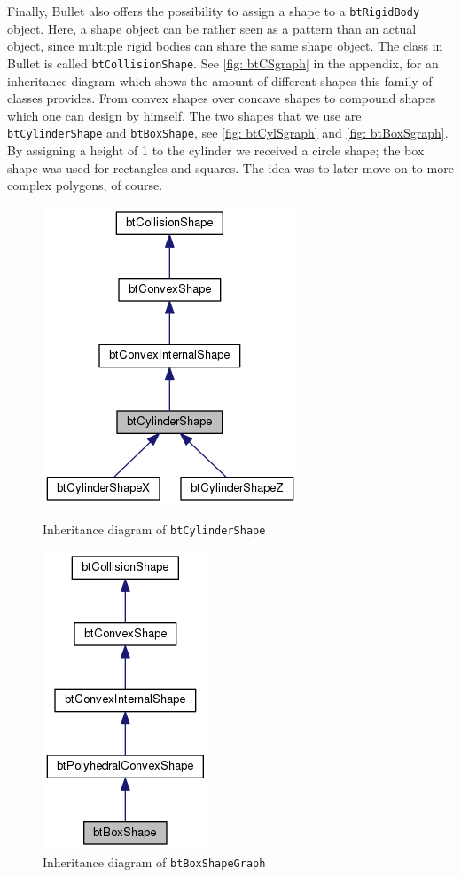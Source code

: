 Finally, Bullet also offers the possibility to assign a shape to a \texttt{btRigidBody} object. Here, a shape object can be rather seen as a pattern than an actual object, since multiple rigid bodies can share the same shape object. The class in Bullet is called \texttt{btCollisionShape}. See \autoref{fig: btCSgraph} in the appendix, for an inheritance diagram which shows the amount of different shapes this family of classes provides. From convex shapes over concave shapes to compound shapes which one can design by himself. The two shapes that we use are \texttt{btCylinderShape} and \texttt{btBoxShape}, see \autoref{fig: btCylSgraph} and \autoref{fig: btBoxSgraph}. By assigning a height of 1 to the cylinder we received a circle shape; the box shape was used for rectangles and squares. The idea was to later move on to more complex polygons, of course.
\begin{figure}[ht]
\centering
\begin{minipage}{.45\linewidth}
\centering
\includegraphics[scale=0.5]{img/RigidBodies/btCylinderShapeGraph.png}
\caption{Inheritance diagram of \texttt{btCylinderShape}}
\label{fig: btCylSgraph}
\end{minipage}
\hspace{.05\linewidth}
\begin{minipage}{.45\linewidth}
\centering
\includegraphics[scale=0.5]{img/RigidBodies/btBoxShapeGraph.png}
\caption{Inheritance diagram of \texttt{btBoxShapeGraph}}
\label{fig: btBoxSgraph}
\end{minipage}
\end{figure}

